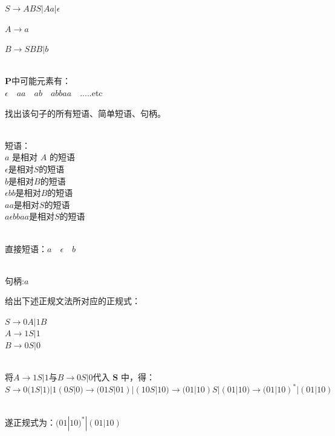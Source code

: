 \documentclass{cisXXX} %
\begin{document}
\begin{CJK}{UTF8}{gbsn}
$S\rightarrow ABS|Aa|\epsilon $

$A\rightarrow a$

$B\rightarrow SBB|b$

~\\
\textbf{P}中可能元素有：
~\\

$\epsilon \quad aa \quad ab \quad abbaa \quad ....$\quad.etc

\HWsubproblem
找出该句子的所有短语、简单短语、句柄。

~\\
短语：
~\\

$a$ 是相对 $A$ 的短语
~\\

$\epsilon$是相对$S$的短语
~\\

$b$是相对$B$的短语
~\\

$\epsilon bb$是相对$B$的短语
~\\

$aa$是相对$S$的短语
~\\

$a\epsilon bbaa$是相对$S$的短语

~\\
直接短语：$a \quad \epsilon \quad b$

~\\
句柄:\quad $a$



\HWproblem
给出下述正规文法所对应的正规式：

$S\rightarrow 0A|1B$
~\\

$A\rightarrow 1S|1$
~\\

$B\rightarrow 0S|0$

~\\
将\quad$A\rightarrow 1S|1$\quad 与\quad $B\rightarrow 0S|0$\quad 代入 \textbf{S} 中，得：
~\\

$S\rightarrow0(1S|1)|1(0S|0) \rightarrow (01S|01)|(10S|10) \rightarrow (01|10)S|(01|10) \rightarrow (01|10)^{*}|(01|10)$

~\\
遂正规式为：$(01|10)^{*}|(01|10)$
\end{CJK}
\end{document}
